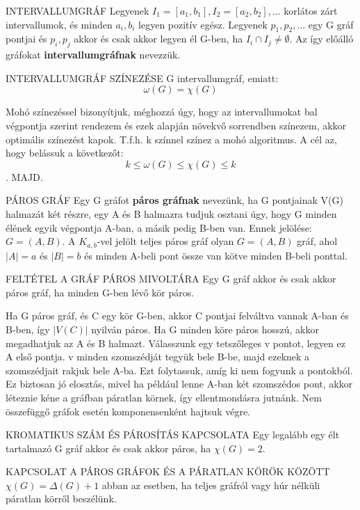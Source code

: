 \begin{definicio}{INTERVALLUMGRÁF}
Legyenek $I_1 = [a_1, b_1], I_2 = [a_2, b_2],...$ korlátos zárt intervallumok, és minden $a_i, b_i$ legyen pozitív egész. Legyenek $p_1, p_2,...$ egy G gráf pontjai és ${p_i, p_j}$ akkor és csak akkor legyen él G-ben, ha $I_i\cap I_j \not= \emptyset$. Az így előálló gráfokat \textbf{intervallumgráfnak} nevezzük.
\end{definicio}

\begin{tetel}{INTERVALLUMGRÁF SZÍNEZÉSE}
G intervallumgráf, emiatt:
$$\omega(G) = \chi(G)$$
\end{tetel}

\begin{bizonyitas}{}
Mohó színezéssel bizonyítjuk, méghozzá úgy, hogy az intervallumokat bal végpontja szerint rendezem és ezek alapján növekvő sorrendben színezem, akkor optimális színezést kapok. T.f.h. k színnel színez a mohó algoritmus. A cél az, hogy belássuk a következőt:
$$k \leq \omega(G) \leq \chi(G) \leq k$$. MAJD.
\end{bizonyitas}

\begin{definicio}{PÁROS GRÁF}
Egy G gráfot \textbf{páros gráfnak} nevezünk, ha G pontjainak V(G) halmazát két részre, egy A és B halmazra tudjuk osztani úgy, hogy G minden élének egyik végpontja A-ban, a másik pedig B-ben van. Ennek jelölése: $G = (A,B)$. A $K_{a,b}$-vel jelölt teljes páros gráf olyan $G=(A,B)$ gráf, ahol $|A| = a$ és $|B| = b$ és minden A-beli pont össze van kötve minden B-beli ponttal.
\end{definicio}

\begin{tetel}{FELTÉTEL A GRÁF PÁROS MIVOLTÁRA}
Egy G gráf akkor és csak akkor páros gráf, ha minden G-ben lévő kör páros.
\end{tetel}

\begin{bizonyitas}{}
Ha G páros gráf, és C egy kör G-ben, akkor C pontjai felváltva vannak A-ban és B-ben, így $|V(C)|$ nyilván páros. Ha G minden köre páros hosszú, akkor megadhatjuk az A és B halmazt. Válasszunk egy tetszőleges v pontot, legyen ez A első pontja.  v minden szomszédját tegyük bele B-be, majd ezeknek a szomszédjait rakjuk bele A-ba. Ezt folytassuk, amíg ki nem fogyunk a pontokból. Ez biztosan jó elosztás, mivel ha például lenne A-ban két szomszédos pont, akkor léteznie kéne a gráfban páratlan körnek, így ellentmondásra jutnánk. Nem összefüggő gráfok esetén komponensenként hajtsuk végre.
\end{bizonyitas}

\begin{tetel}{KROMATIKUS SZÁM ÉS PÁROSÍTÁS KAPCSOLATA}
Egy legalább egy élt tartalmazó G gráf akkor és csak akkor páros, ha $\chi(G) = 2$.
\end{tetel}

\begin{tetel}{KAPCSOLAT A PÁROS GRÁFOK ÉS A PÁRATLAN KÖRÖK KÖZÖTT}
  $\chi(G) = \Delta(G)+1$ abban az esetben, ha teljes gráfról vagy húr nélküli páratlan körről beszélünk.
\end{tetel}
